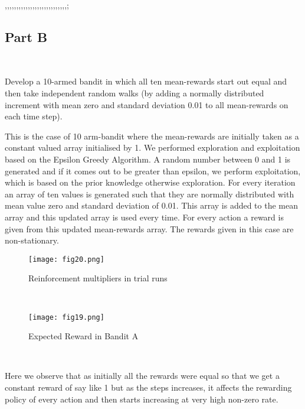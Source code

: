 ,,,,,,,,,,,,,,,,,,,,,,,,,,,;\documentclass[conference]{IEEEtran}
\begin{document}
\subsection{Part B}
\\
\par Develop a 10-armed bandit in which all ten mean-rewards
start out equal and then take independent random walks (by
adding a normally distributed increment with mean zero and
standard deviation 0.01 to all mean-rewards on each time step).
\\
\par This is the case of 10 arm-bandit where the mean-rewards
are initially taken as a constant valued array initialised by
1. We performed exploration and exploitation based on the
Epsilon Greedy Algorithm. A random number between 0 and
1 is generated and if it comes out to be greater than epsilon, we
perform exploitation, which is based on the prior knowledge
otherwise exploration. For every iteration an array of ten
values is generated such that they are normally distributed
with mean value zero and standard deviation of 0.01. This
array is added to the mean array and this updated array is
used every time. For every action a reward is given from this
updated mean-rewards array. The rewards given in this case
are non-stationary.
\\
\begin{figure}[htbp]
\centerline{\texttt{[image: fig20.png]}}
\caption{Reinforcement multipliers in trial runs}
\label{figure}
\end{figure}
\\
\begin{figure}[htbp]
\centerline{\texttt{[image: fig19.png]}}
\caption{Expected Reward in Bandit A}
\label{figure}
\end{figure}
\\
\par Here we observe that as initially all the rewards were equal
so that we get a constant reward of say like 1 but as the steps
increases, it affects the rewarding policy of every action and then
starts increasing at very high non-zero rate.
\\
\end{document}
